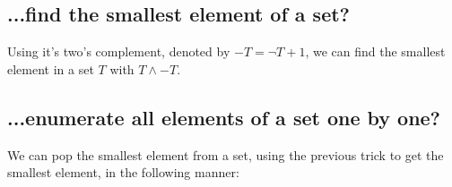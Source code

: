 \subsection*{...find the smallest element of a set?}
Using it's two's complement, denoted by $-T = \lnot T+1$, we can find the smallest element in a set $T$ with $T\land -T$.

\subsection*{...enumerate all elements of a set one by one?}
We can pop the smallest element from a set, using the previous trick to get the smallest element, in the following manner: